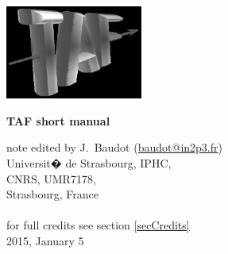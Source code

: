 \documentclass[a4paper, 12pt, twoside]{article}
\begin{document}
\sloppy


\begin{minipage}{.3\linewidth}
\begin{flushleft}
\includegraphics*[width=45mm]{logoTAF.eps}\\
\end{flushleft}
\end{minipage}
\begin{minipage}{.65\linewidth}
\begin{flushleft}
\Large{\bf TAF short manual}
\end{flushleft}
\begin{flushright}
note edited by J.~Baudot (\href{mailto:baudot@in2p3.fr}{baudot@in2p3.fr})\\
Universit� de Strasbourg, IPHC, \\
CNRS, UMR7178,\\
Strasbourg, France\\
\hspace{1 cm} \\
for full credits see section \ref {secCredits}\\
\vspace*{.2cm}
2015, January 5
\end{flushright}
\end{minipage}

\vspace{.5cm}

\tableofcontents
\end{document}
